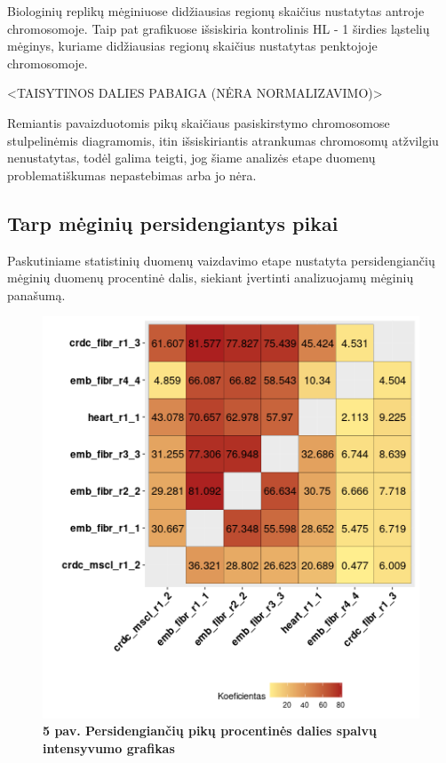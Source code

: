 \documentclass[12pt]{article}
\begin{document}
Biologinių replikų mėginiuose didžiausias regionų skaičius nustatytas antroje
chromosomoje. Taip pat grafikuose išsiskiria kontrolinis HL - 1 širdies
ląstelių mėginys, kuriame didžiausias regionų skaičius nustatytas penktojoje
chromosomoje.

<TAISYTINOS DALIES PABAIGA (NĖRA NORMALIZAVIMO)>

Remiantis pavaizduotomis pikų skaičiaus pasiskirstymo chromosomose
stulpelinėmis diagramomis, itin išsiskiriantis atrankumas chromosomų atžvilgiu
nenustatytas, todėl galima teigti, jog šiame analizės etape duomenų
problematiškumas nepastebimas arba jo nėra.

\newpage


\subsection{Tarp mėginių persidengiantys pikai}
Paskutiniame statistinių duomenų vaizdavimo etape nustatyta persidengiančių
mėginių duomenų procentinė dalis, siekiant įvertinti analizuojamų mėginių
panašumą.

\begin{figure}[htb]
    \begin{center}
        \includegraphics[width=0.6\linewidth]{../Figures/peak_overlaps.png}
        \vspace{-2\baselineskip}
        \caption*{\small\textbf{5 pav. Persidengiančių pikų procentinės
                                dalies spalvų intensyvumo grafikas}}
    \end{center}
\end{figure}
\end{document}
